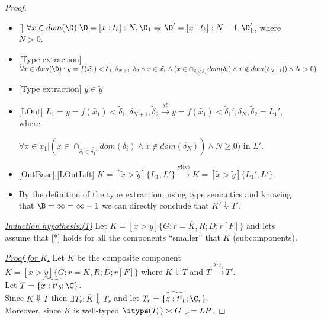 \begin{proof}
\begin{itemize}
\begin{itemize}
   
   \item {[]} $\forall x\in dom(\D)|\D=[x:t_b]:N,\D_1\Rightarrow \D'=[x:t_b]:N-1,\D_1'$, where $N>0$.
   

\item {[Type extraction]}  $\forall x\in dom(\D):y=f(\tilde{x_1})<\tilde{\delta_1},\delta_{N+1},\tilde{\delta_2}\wedge x\in \tilde{x_1} \wedge\\ (x\in\cap_{\delta_i\in\tilde{\delta_1}}dom(\delta_i) \wedge x\notin dom(\delta_{N+1})) \wedge N>0)$

  \item {[Type extraction]} $y\in \tilde{y}$
  
  \item {[LOut]} $L_1=y=f(\tilde{x_1})<\tilde{\delta}_1,\delta_{N+1},\tilde{\delta}_2\xrightarrow{\text{y!}}y=f(\tilde{x_1})<\tilde{\delta}_1',\delta_N,\tilde{\delta}_2=L_1'$, where
  
   $\forall x\in \tilde{x_1}| (x\in\cap_{\delta_i\in\tilde{\delta_1'}}dom(\delta_i) \wedge x\notin dom(\delta_{N})) \wedge N\geq 0)$ in $L'$.
  
  
 \item {[OutBase],[LOutLift]} $K=[\tilde{x}>\tilde{y}]\{L_1,L'\}\xrightarrow{\text{y!(v)}}K=[\tilde{x}>\tilde{y}]\{L_1',L'\}$.
 
 \item By the definition of the type extraction, using type semantics and knowing that $\B=\infty=\infty-1$ we can directly conclude that $K'\Downarrow T'$.

    
         
   \end{itemize}  
    
  

    
\end{itemize}








\underline{\textit{Induction hypothesis.(1)}} Let $K=[\tilde{x}>\tilde{y}]\{G;r=\overline{K},R;D;r[F]\}$ and lets assume that [*] holds for all the components ``smaller'' that $K$ (subcomponents).

\underline{\textit{Proof for $K$}.} Let $K$ be the composite component $K=[\tilde{x}>\tilde{y}]\{G;r=\overline{K},R;D;r[F]\}$ where $K\Downarrow T$ and $T\xrightarrow{\text{$\lambda:t_b$}}T'$.\\
Let $T=\{\widetilde{x:{t^i}_b};\C\}$. \\
Since $K\Downarrow T$ then $\exists T_r: \overline{K}\Downarrow T_r$ and let $T_r=\{\widetilde{z:{t^i}_b};\C_r\}$.\\
Moreover,  since $K$ is well-typed $\itype(T_r)\bowtie G\downharpoonright_r=LP$.



\end{proof}
